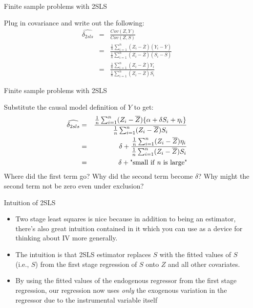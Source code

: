 \documentclass{beamer}
\begin{document}
\begin{frame}{Finite sample problems with 2SLS}

Plug in covariance and write out the following:
		\begin{eqnarray*}
		\widehat{\delta_{2sls}} &=& \frac{Cov(Z,Y)}{Cov(Z,S)} \\
		&=& \frac{ \frac{1}{n}\sum_{i=1}^n(Z_i - \overline{Z})(Y_i - \overline{Y})}{\frac{1}{n}\sum_{i=1}^n(Z_i - \overline{Z})(S_i - \overline{S})} \\
		&=& \frac{ \frac{1}{n} \sum_{i=1}^n(Z_i - \overline{Z})Y_i}{ \frac{1}{n} \sum_{i=1}^n (Z_i-\overline{Z})S_i}
		\end{eqnarray*}

\end{frame}

\begin{frame}{Finite sample problems with 2SLS}

Substitute the causal model definition of $Y$ to get:
		\begin{eqnarray*}
		\widehat{\delta_{2sls} }&=& \frac{ \frac{1}{n} \sum_{i=1}^n (Z_i -\overline{Z})\{ \alpha + \delta{S}_i + \eta_i \}}{\frac{1}{n} \sum_{i=1}^n (Z_i - \overline{Z})S_i} \\
		&=& \delta + \frac{\frac{1}{n} \sum_{i=1}^n (Z_i - \overline{Z})\eta_i}{\frac{1}{n}\sum_{i=1}^n(Z_i - \overline{Z})S_i} \\
		&=& \delta + \text{"small if \emph{n} is large"}
		\end{eqnarray*}Where did the first term go? Why did the second term become $\delta$? Why might the second term not be zero even under exclusion?

\end{frame}	


\begin{frame}{Intuition of 2SLS}
	
	\begin{itemize}
	\item Two stage least squares is nice because in addition to being an estimator, there's also great intuition contained in it which you can use as a device for thinking about IV more generally. 
	\item The intuition is that 2SLS estimator replaces $S$ with the fitted values of $S$ (i.e., $\widehat{S}$) from the first stage regression of $S$ onto $Z$ and all other covariates.  
	\item By using the fitted values of the endogenous regressor from the first stage regression, our regression now uses \emph{only} the exogenous variation in the regressor due to the instrumental variable itself
	\end{itemize}
\end{frame}
\end{document}
